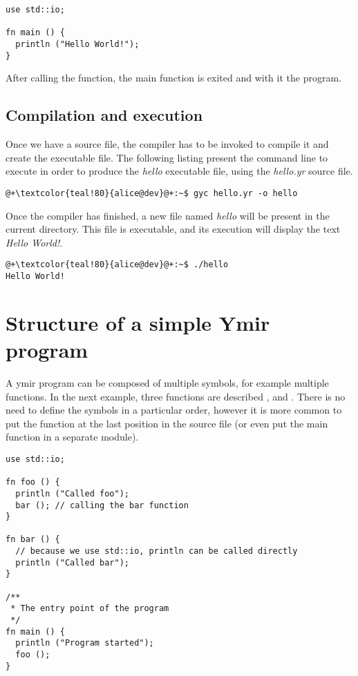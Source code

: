 \begin{lstlisting}[style=coloredverbatim, caption=Source file \textit{hello.yr}]
use std::io;

fn main () {
  println ("Hello World!");
}
\end{lstlisting}

After calling the  function, the main function is exited
and with it the program.

\subsection{Compilation and execution}

Once we have a source file, the compiler has to be invoked to compile it and
create the executable file. The following listing present the command line to
execute in order to produce the \textit{hello} executable file, using the
\textit{hello.yr} source file.

\begin{lstlisting}[style=bashVerb, escapechar=@+]
@+\textcolor{teal!80}{alice@dev}@+:~$ gyc hello.yr -o hello
\end{lstlisting}

Once the compiler has finished, a new file named \textit{hello} will be present
in the current directory. This file is executable, and its execution will
display the text \textit{Hello World!}.

\begin{lstlisting}[style=bashVerb, escapechar=@+]
@+\textcolor{teal!80}{alice@dev}@+:~$ ./hello
Hello World!
\end{lstlisting}

\section{Structure of a simple Ymir program}

A ymir program can be composed of multiple symbols, for example multiple
functions. In the next example, three functions are described ,
 and . There is no need to define the symbols in a
particular order, however it is more common to put the  function at
the last position in the source file (or even put the main function in a
separate module).

\begin{lstlisting}[style=coloredverbatim, caption=First structured source file]
use std::io;

fn foo () {
  println ("Called foo");
  bar (); // calling the bar function
}

fn bar () {
  // because we use std::io, println can be called directly
  println ("Called bar");
}

/**
 * The entry point of the program
 */
fn main () {
  println ("Program started");
  foo ();
}
\end{lstlisting}

